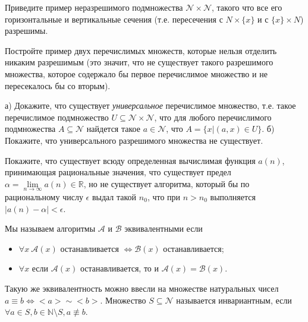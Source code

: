 
\begin{task}
	Приведите пример неразрешимого подмножества $\mathcal{N} \times \mathcal{N}$, такого что все его горизонтальные и вертикальные
    сечения (т.е. пересечения с $N \times \{x\}$ и с $\{x\} \times N$) разрешимы. 
\end{task}


\begin{task}
    Постройте пример двух перечислимых множеств, которые нельзя отделить никаким разрешимым (это значит, что не существует такого
    разрешимого множества, которое содержало бы первое перечислимое множество и не пересекалось бы со вторым).
\end{task}


\begin{task}
    а) Докажите, что существует \textit{универсальное} перечислимое множество, т.е. такое перечислимое подмножество $U \subseteq
    \mathcal{N} \times \mathcal{N}$, что для любого перечислимого подмножества $A \subseteq \mathcal{N}$ найдется такое $a \in
    \mathcal{N}$, что $A = \{x | (a, x) \in U\}$.
	б) Покажите, что универсального разрешимого множества не существует.
\end{task}

\begin{task}
	Покажите, что существует всюду определенная вычислимая функция $a(n)$, принимающая рациональные значения, что существует
    предел $\alpha = \lim\limits_{n \to \infty} a(n) \in \mathbb{R}$, но не существует алгоритма, который бы по рациональному
    числу $\epsilon$ выдал такой $n_0$, что при $n > n_0$ выполняется $|a(n) - \alpha| < \epsilon$. 
\end{task}



Мы называем алгоритмы $\mathcal{A}$ и $\mathcal{B}$ эквивалентными если 
\begin{itemize}
	\item $\forall x\  \mathcal{A}(x)$ останавливается $\Leftrightarrow \mathcal{B}(x)$ останавливается;
	\item $\forall x$ если $\mathcal{A}(x)$ останавливается, то и $\mathcal{A}(x) = \mathcal{B}(x)$.
\end{itemize} 

Такую же эквивалентность можно ввесли на множестве натуральных чисел $a \equiv b \Leftrightarrow {<}a{>} \sim {<}b{>}$. Множество 
$S \subseteq \mathcal{N}$ называется инвариантным, если $\forall a \in S, b \in \mathbb{N} \setminus S, a \not\equiv b$.

